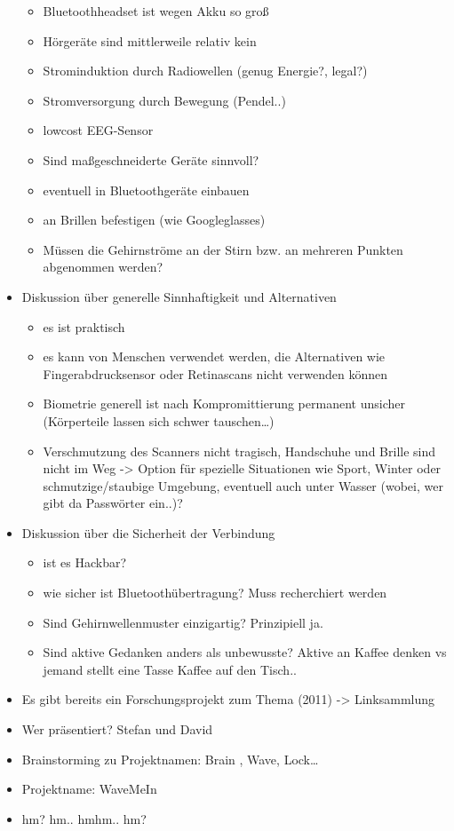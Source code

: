 \begin{itemize}
  \begin{itemize}
  \itemsep1pt\parskip0pt
  \item
    Bluetoothheadset ist wegen Akku so groß
  \item
    Hörgeräte sind mittlerweile relativ kein
  \item
    Strominduktion durch Radiowellen (genug Energie?, legal?)
  \item
    Stromversorgung durch Bewegung (Pendel..)
  \item
    lowcost EEG-Sensor
  \item
    Sind maßgeschneiderte Geräte sinnvoll?
  \item
    eventuell in Bluetoothgeräte einbauen
  \item
    an Brillen befestigen (wie Googleglasses)
  \item
    Müssen die Gehirnströme an der Stirn bzw. an mehreren Punkten
    abgenommen werden?
  \end{itemize}
\item
  Diskussion über generelle Sinnhaftigkeit und Alternativen

  \begin{itemize}
  \itemsep1pt\parskip0pt
  \item
    es ist praktisch
  \item
    es kann von Menschen verwendet werden, die Alternativen wie
    Fingerabdrucksensor oder Retinascans nicht verwenden können
  \item
    Biometrie generell ist nach Kompromittierung permanent unsicher
    (Körperteile lassen sich schwer tauschen\ldots{})
  \item
    Verschmutzung des Scanners nicht tragisch, Handschuhe und Brille
    sind nicht im Weg -\textgreater{} Option für spezielle Situationen
    wie Sport, Winter oder schmutzige/staubige Umgebung, eventuell auch
    unter Wasser (wobei, wer gibt da Passwörter ein..)?
  \end{itemize}
\item
  Diskussion über die Sicherheit der Verbindung

  \begin{itemize}
  \itemsep1pt\parskip0pt
  \item
    ist es Hackbar?
  \item
    wie sicher ist Bluetoothübertragung? Muss recherchiert werden
  \item
    Sind Gehirnwellenmuster einzigartig? Prinzipiell ja.
  \item
    Sind aktive Gedanken anders als unbewusste? Aktive an Kaffee denken
    vs jemand stellt eine Tasse Kaffee auf den Tisch..
  \end{itemize}
\item
  Es gibt bereits ein Forschungsprojekt zum Thema (2011) -\textgreater{}
  Linksammlung
\item
  Wer präsentiert? Stefan und David
\item
  Brainstorming zu Projektnamen: Brain , Wave, Lock\ldots{}
\item
  Projektname: WaveMeIn
\item
  hm? hm.. hmhm.. hm?
\end{itemize}
